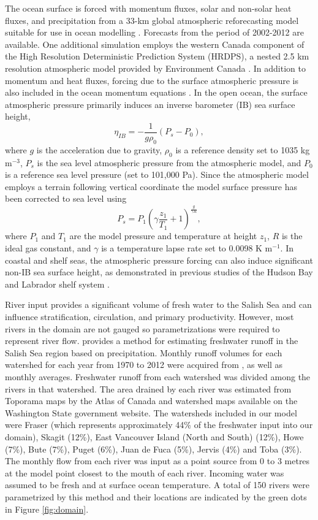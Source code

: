 \documentclass[letterpaper]{tATO2e}
\begin{document}
{\color{red} The ocean surface is forced with momentum fluxes, solar and non-solar heat fluxes, and precipitation from a 33-km global atmospheric reforecasting model suitable for use in ocean modelling \citep{smith2014new}.} Forecasts from the period of 2002-2012 are available. One additional simulation employs the western Canada component of the High Resolution Deterministic Prediction System (HRDPS), a nested 2.5 km resolution atmospheric model provided by Environment Canada \citep{ECModel}. In addition to momentum and heat fluxes, forcing due to the surface atmospheric pressure is also included in the ocean momentum equations \citep{madec2012nemo}. In the open ocean, the surface atmospheric pressure primarily induces an inverse barometer (IB) sea surface height,
\begin{equation}
 \eta_{IB} = -\frac{1}{g\rho_{0}}\left(P_{s}-P_0\right), \label{eq:inverse}
\end{equation}
where $g$ is the acceleration due to gravity, $\rho_{0}$ is a reference density set to 1035 kg m$^{-3}$, $P_{s}$ is the sea level atmospheric pressure from the atmospheric model, and $P_0$ is a reference sea level pressure (set to 101,000 Pa). Since the atmospheric model employs a terrain following vertical coordinate the model surface pressure has been corrected to sea level using \citep{holton1992introduction}
\[ P_s = P_1\left(\gamma\frac{z_1}{T_1} +1 \right)^\frac{g}{\gamma R},\]
where $P_1$ and $T_1$ are the model pressure and temperature at height $z_1$, $R$ is the ideal gas constant, and $\gamma$ is a temperature lapse rate set to 0.0098 K m$^{-1}$. In coastal and shelf seas, the atmospheric pressure forcing can also induce significant non-IB sea surface height, as demonstrated in previous studies of the Hudson Bay and Labrador shelf system \citep{wright1987influence,young1995synoptic}.

River input provides a significant volume of fresh water to the Salish Sea and can influence stratification, circulation, and primary productivity. However, most rivers in the domain are not gauged so parametrizations were required to represent river flow. \citet{morrison2011rivers} provides a method for estimating freshwater runoff in the Salish Sea region based on precipitation. Monthly runoff volumes for each watershed for each year from 1970 to 2012 were acquired from \citet{morrison2011rivers}, as well as monthly averages. Freshwater runoff from each watershed was divided among the rivers in that watershed. The area drained by each river was estimated from Toporama maps by the Atlas of Canada and watershed maps available on the Washington State government website. The watersheds included in our model were Fraser (which represents approximately 44\% of the freshwater input into our domain), Skagit (12\%), East Vancouver Island (North and South) (12\%), Howe (7\%), Bute (7\%), Puget (6\%), Juan de Fuca (5\%), Jervis (4\%) and Toba (3\%). The monthly flow from each river was input as a point source from 0 to 3 metres at the model point closest to the mouth of each river. Incoming water was assumed to be fresh and at surface {\color{red}ocean temperature}. A total of 150 rivers were parametrized by this method and their locations are indicated by the green dots in Figure \ref{fig:domain}.
\end{document}
